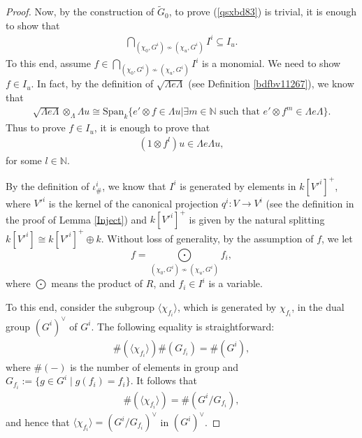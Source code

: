 \documentclass[10pt,a4paper]{amsart}
\begin{document}
\begin{proof}
Now, by the construction of $\tilde{G}_0$, to prove (\ref{qsxbd83}) is trivial, it is enough to show that 
\begin{align}\label{2736sdd}
\bigcap\limits_{(\chi_0, G^i) \not\sim (\chi_u, G^i)} I^i \subseteq I_u.
\end{align}
To this end, assume 
$f \in \bigcap\limits_{(\chi_0, G^i) 
\not\sim (\chi_u, G^i)} I^i $ is 
a monomial.
We need to show $f \in I_u$. 
In fact,
by the definition of 
$\sqrt{\Lambda e \Lambda}$ 
(see Definition \ref{bdfbv11267}), 
we know that 
\begin{align}\label{ahjd 710}
\sqrt{\Lambda e \Lambda} \otimes_{\Lambda} \Lambda u \cong 
\mathrm{Span}_{k}\Big\{ e' \otimes f \in 
\Lambda u \big\vert \exists m \in 
\mathbb{N}\mbox{ such that }
e' \otimes f^m \in \Lambda e \Lambda  
\Big\}. 
\end{align}
Thus to prove $f \in I_u$, it is enough to prove that 
\begin{align}\label{hxowc453}
(1 \otimes f^l)u \in \Lambda e \Lambda u,
\end{align}
for some $l \in \mathbb{N}$.


\vspace{2mm}

By the definition of $\iota_{\#}^i$, we know that 
$I^i$ is generated by elements in $k[V'^{i}]^{+}$, where $V'^{i}$ is the
kernel of the canonical projection $q^i: V \rightarrow V^i$ 
(see the definition in the proof of Lemma \ref{Inject}) and 
$k[V'^{i}]^{+}$ is given by the natural splitting 
$k[V'^{i}] \cong k[V'^{i}]^{+} \oplus k$. 
Without loss of generality, by the assumption of $f$, we let 
$$
f = \bigodot\limits_{(\chi_0, G^i) \not\sim (\chi_u, G^i)} f_i,
$$
where $\bigodot$ means 
the product of $R$, and $f_i \in I^i$ is a variable. 

To this end, consider the subgroup
$\langle\chi_{f_i}\rangle$, which 
is generated by $\chi_{f_i}$, in 
the dual group
$(G^i)^{\vee}$ of $G^i$. The following equality is straightforward: 
\begin{align}\label{BUXGECG3}
\#(\langle\chi_{f_i}\rangle) \#(G_{f_i}) = \#(G^i),
\end{align}
where $\#(-)$ is
the number of elements in group and
$G_{f_i} := \{g \in G^i \mid g(f_i) = f_i \}$. 
It follows that 
\begin{align}\label{BUXGECG322}
\#(\langle\chi_{f_i}\rangle)  = \#(G^i / G_{f_i}),
\end{align}
and hence that $\langle\chi_{f_i}\rangle 
=  (G^i / G_{f_i})^{\vee}$ in $(G^i)^{\vee}$.  


\end{proof}
\end{document}
